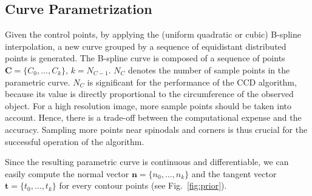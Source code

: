 \documentclass[conference]{IEEEtran}
\begin{document}
\subsection{Curve Parametrization}
Given the control points, by applying the (uniform quadratic or
cubic) B-spline interpolation, a new curve
grouped by a sequence of equidistant distributed points is generated. 
The B-spline curve %
is composed of a sequence of points $\mathbf{C} = \{C_0, \ldots,
C_{k}\}$, $k = N_{C-1}$. $N_C$ denotes the number of sample points in the
parametric curve. $N_C$ is significant for the
performance of the CCD algorithm, because its value is directly
proportional to the circumference of the observed object. For a high
resolution image, more sample points should be taken into account.
Hence, there is a trade-off between the computational expense and the
accuracy. Sampling more points near spinodals and corners is thus
crucial for the successful operation of the algorithm.

Since the resulting parametric curve is continuous and
differentiable, we can easily compute the normal vector $\mathbf{n} = \{n_0, \ldots,
n_{k}\}$ and the tangent vector $\mathbf{t} = \{t_0, \ldots, t_{k}\}$
for every contour points (see Fig.~\ref{fig:prior}).
\end{document}
